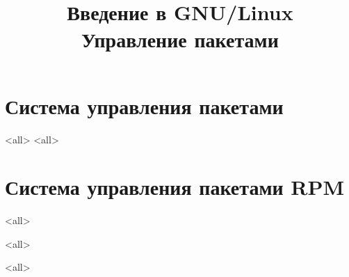 

\title{Введение в GNU/Linux\\Управление пакетами}








\begin{frame}
	\frametitle{}
	\titlepage
	\vspace{-0.5cm}
	\begin{center}
	\end{center}
\end{frame}





\section{Система управления пакетами}

\mode<all>{}
\mode<all>{}

\section{Система управления пакетами RPM}
\mode<all>{}

\mode<all>{}

\mode<all>

